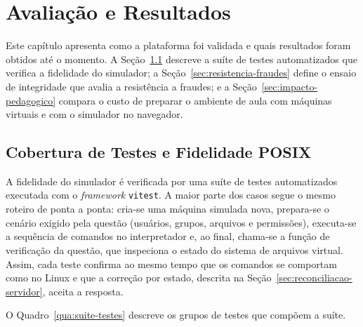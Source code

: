 \chapter{Avaliação e Resultados}
\label{cap:resultados}

Este capítulo apresenta como a plataforma foi validada e quais resultados foram obtidos até o momento. A Seção~\ref{sec:testes-cobertura} descreve a suíte de testes automatizados que verifica a fidelidade do simulador; a Seção~\ref{sec:resistencia-fraudes} define o ensaio de integridade que avalia a resistência a fraudes; e a Seção~\ref{sec:impacto-pedagogico} compara o custo de preparar o ambiente de aula com máquinas virtuais e com o simulador no navegador.

\section{Cobertura de Testes e Fidelidade POSIX}
\label{sec:testes-cobertura}

A fidelidade do simulador é verificada por uma suíte de testes automatizados executada com o \textit{framework} \texttt{vitest}. A maior parte dos casos segue o mesmo roteiro de ponta a ponta: cria-se uma máquina simulada nova, prepara-se o cenário exigido pela questão (usuários, grupos, arquivos e permissões), executa-se a sequência de comandos no interpretador e, ao final, chama-se a função de verificação da questão, que inspeciona o estado do sistema de arquivos virtual. Assim, cada teste confirma ao mesmo tempo que os comandos se comportam como no Linux e que a correção por estado, descrita na Seção~\ref{sec:reconciliacao-servidor}, aceita a resposta.

O Quadro~\ref{qua:suite-testes} descreve os grupos de testes que compõem a suíte.

